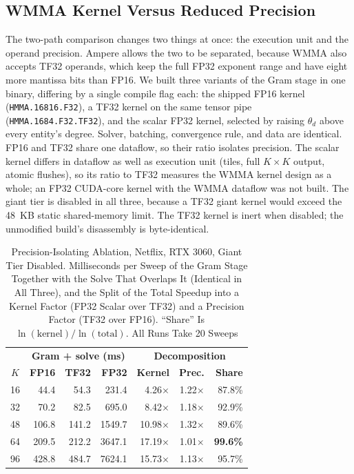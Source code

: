 \subsection{WMMA Kernel Versus Reduced Precision}
\label{ssec:precisioniso}

The two-path comparison changes two things at once: the execution unit and the operand precision. Ampere allows the two to be separated, because WMMA also accepts TF32 operands, which keep the full FP32 exponent range and have eight more mantissa bits than FP16. We built three variants of the Gram stage in one binary, differing by a single compile flag each: the shipped FP16 kernel (\texttt{HMMA.16816.F32}), a TF32 kernel on the same tensor pipe (\texttt{HMMA.1684.F32.TF32}), and the scalar FP32 kernel, selected by raising $\theta_d$ above every entity's degree. Solver, batching, convergence rule, and data are identical. FP16 and TF32 share one dataflow, so their ratio isolates precision. The scalar kernel differs in dataflow as well as execution unit (tiles, full $K \times K$ output, atomic flushes), so its ratio to TF32 measures the WMMA kernel design as a whole; an FP32 CUDA-core kernel with the WMMA dataflow was not built. The giant tier is disabled in all three, because a TF32 giant kernel would exceed the 48~KB static shared-memory limit. The TF32 kernel is inert when disabled; the unmodified build's disassembly is byte-identical.

\begin{table}[!t]
\caption{Precision-Isolating Ablation, Netflix, RTX 3060, Giant Tier Disabled. Milliseconds per Sweep of the Gram Stage Together with the Solve That Overlaps It (Identical in All Three), and the Split of the Total Speedup into a Kernel Factor (FP32 Scalar over TF32) and a Precision Factor (TF32 over FP16). ``Share'' Is $\ln(\text{kernel})/\ln(\text{total})$. All Runs Take 20 Sweeps}
\label{tab:precisioniso}
\centering
\footnotesize
\renewcommand{\arraystretch}{1.05}
\setlength{\tabcolsep}{3pt}
\begin{tabular}{crrrrrr}
\toprule
 & \multicolumn{3}{c}{\textbf{Gram + solve (ms)}} & \multicolumn{3}{c}{\textbf{Decomposition}} \\
\textbf{$K$} & \textbf{FP16} & \textbf{TF32} & \textbf{FP32} & \textbf{Kernel} & \textbf{Prec.} & \textbf{Share} \\
\midrule
16 & 44.4  & 54.3  & 231.4   & 4.26$\times$  & 1.22$\times$ & 87.8\% \\
32 & 70.2  & 82.5  & 695.0   & 8.42$\times$  & 1.18$\times$ & 92.9\% \\
48 & 106.8 & 141.2 & 1549.7  & 10.98$\times$ & 1.32$\times$ & 89.6\% \\
64 & 209.5 & 212.2 & 3647.1  & 17.19$\times$ & 1.01$\times$ & \textbf{99.6\%} \\
96 & 428.8 & 484.7 & 7624.1  & 15.73$\times$ & 1.13$\times$ & 95.7\% \\
\bottomrule
\end{tabular}
\end{table}

